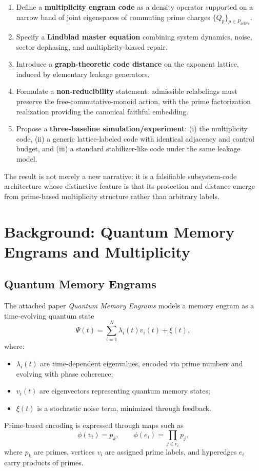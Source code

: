 \documentclass[11pt]{article}
\begin{document}
\begin{enumerate}[leftmargin=*]
  \item Define a \textbf{multiplicity engram code} as a density operator
        supported on a narrow band of joint eigenspaces of commuting prime
        charges $\{Q_p\}_{p\in P_{\text{active}}}$.
  \item Specify a \textbf{Lindblad master equation} combining system dynamics,
        noise, sector dephasing, and multiplicity-biased repair.
  \item Introduce a \textbf{graph-theoretic code distance} on the exponent
        lattice, induced by elementary leakage generators.
  \item Formulate a \textbf{non-reducibility} statement: admissible
        relabelings must preserve the free-commutative-monoid action, with
        the prime factorization realization providing the canonical faithful
        embedding.
  \item Propose a \textbf{three-baseline simulation/experiment}: (i) the
        multiplicity code, (ii) a generic lattice-labeled code with identical
        adjacency and control budget, and (iii) a standard stabilizer-like
        code under the same leakage model.
\end{enumerate}

The result is not merely a new narrative: it is a falsifiable subsystem-code
architecture whose distinctive feature is that its protection and distance
emerge from prime-based multiplicity structure rather than arbitrary labels.

\section{Background: Quantum Memory Engrams and Multiplicity}

\subsection{Quantum Memory Engrams}

The attached paper \emph{Quantum Memory Engrams} models a memory engram as a
time-evolving quantum state
\begin{equation}
  \Psi(t)
  = \sum_{i=1}^N \lambda_i(t) v_i(t) + \xi(t),
  \label{eq:psi-decomposition}
\end{equation}
where:
\begin{itemize}[leftmargin=*]
  \item $\lambda_i(t)$ are time-dependent eigenvalues, encoded via prime
        numbers and evolving with phase coherence;
  \item $v_i(t)$ are eigenvectors representing quantum memory states;
  \item $\xi(t)$ is a stochastic noise term, minimized through feedback.
\end{itemize}
Prime-based encoding is expressed through maps such as
\begin{equation}
  \phi(v_i) = p_k, \qquad
  \phi(e_i) = \prod_{j \in e_i} p_j,
\end{equation}
where $p_k$ are primes, vertices $v_i$ are assigned prime labels, and hyperedges
$e_i$ carry products of primes.
\end{document}
